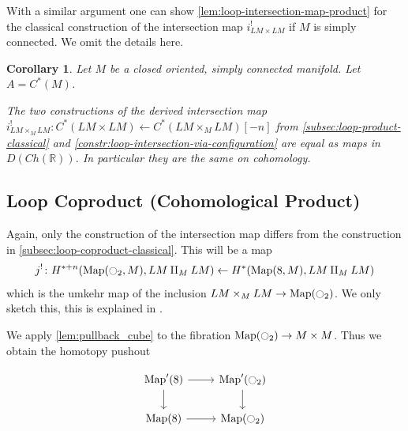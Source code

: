 \documentclass{scrartcl}
\theoremstyle{plain}
\newtheorem{corollary}[theorem]{Corollary}
\theoremstyle{definition}
\newtheorem{remark}[theorem]{Remark}
\newcommand{\R}{\mathbb R}
\newcommand{\from}{\leftarrow}
\DeclareMathOperator{\Map}{Map}
\renewcommand{\coprod}{\mathbin{\amalg}}
\begin{document}
With a similar argument one can show \cref{lem:loop-intersection-map-product} for the classical construction of the intersection map $i^!_{LM\times LM}$ if $M$ is simply connected. We omit the details here. 

\begin{corollary}\label{thm:loop-products-identity}
    Let $M$ be a closed oriented, simply connected manifold. Let $A = C^*(M)$.

    The two constructions of the derived intersection map $i^!_{LM\times_M LM}\colon C^*(LM\times LM) \from C^{*}(LM\times_M LM)[-n]$ from \cref{subsec:loop-product-classical} and \cref{constr:loop-intersection-via-configuration} are equal as maps in $D(Ch(\R))$. In particular they are the same on cohomology.
\end{corollary}



\subsection{Loop Coproduct (Cohomological Product)}\label{subsec:loop-coproduct}
Again, only the construction of the intersection map differs from the construction in \cref{subsec:loop-coproduct-classical}. This will be a map
\begin{align*}
    j^!\colon H^{*+n}(\Map(\ocircle_2, M), LM\coprod_M LM) \from H^*(\Map(8, M), LM \coprod_M LM)
\end{align*}
which is the umkehr map of the inclusion $LM\times_M LM\to \Map(\ocircle_2)$. We only sketch this, this is explained in \cite[3.3]{naef2019string}. 

We apply \ref{lem:pullback_cube} to the fibration $\Map(\ocircle_2)\to M\times M$. Thus we obtain the homotopy pushout

\begin{equation}
    \begin{tikzcd}
        \Map'(8) \rar\dar &\Map'(\ocircle_2)\dar \\
        \Map(8) \rar & \Map(\ocircle_2)
    \end{tikzcd}
\end{equation}
\end{document}
